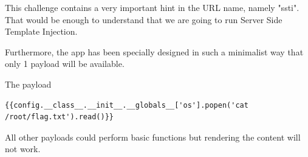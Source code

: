 \documentclass[../main.tex]{subfiles}
\begin{document}
This challenge contains a very important hint in the URL name, namely "ssti". That would be enough to understand that we are going to run Server Side Template Injection.

Furthermore, the app has been specially designed in such a minimalist way that only 1 payload will be available. 

The payload \begin{verbatim}
{{config.__class__.__init__.__globals__['os'].popen('cat /root/flag.txt').read()}}
\end{verbatim}

All other payloads could perform basic functions but rendering the content will not work.
\end{document}
